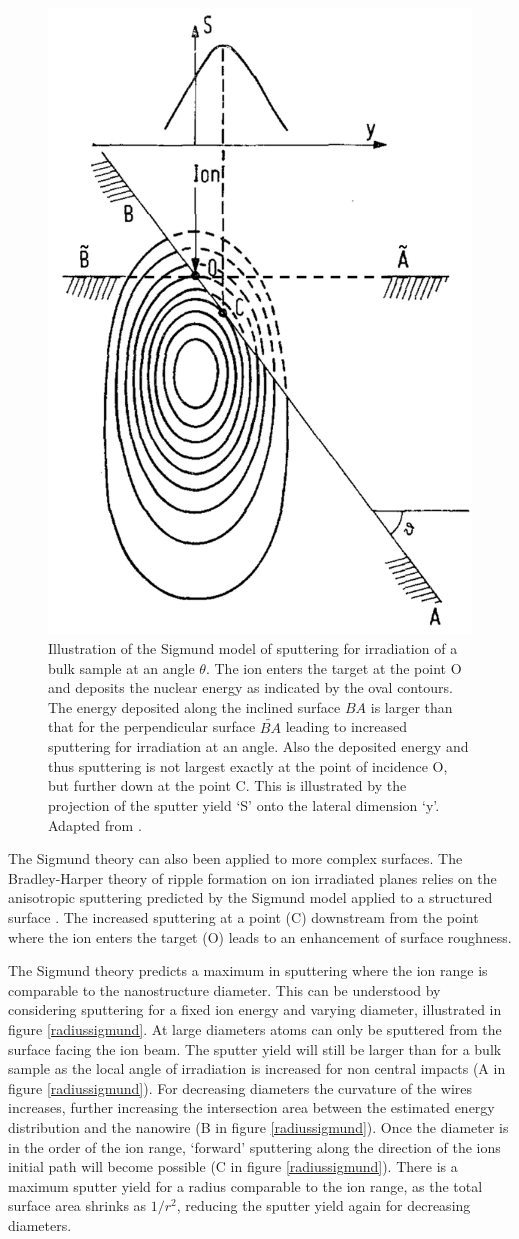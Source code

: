 \begin{figure}
	\centering
		\includegraphics[width=.35\textwidth]{images/anglesigmund.jpg}
	\caption{Illustration of the Sigmund model of sputtering for irradiation of a bulk sample at an angle $\theta$. The ion enters the target at the point O and deposits the nuclear energy as indicated by the oval contours. The energy deposited along the inclined surface $BA$ is larger than that for the perpendicular surface $\widetilde{BA}$ leading to increased sputtering for irradiation at an angle. Also the deposited energy and thus sputtering is not largest exactly at the point of incidence O, but further down at the point C. This is illustrated by the projection of the sputter yield `S' onto the lateral dimension `y'. Adapted from \cite{sigmund_mechanism_1973}.}
	\label{anglesigmund}
\end{figure} 

The Sigmund theory can also been applied to more complex surfaces. The Bradley-Harper theory of ripple formation on ion irradiated planes relies on the anisotropic sputtering predicted by the Sigmund model applied to a structured surface \cite{sigmund_mechanism_1973,bradley_theory_1988}. The increased sputtering at a point (C) downstream from the point where the ion enters the target (O) leads to an enhancement of surface roughness.

The Sigmund theory predicts a maximum in sputtering where the ion range is comparable to the nanostructure diameter. This can be understood by considering sputtering for a fixed ion energy and varying diameter, illustrated in figure \ref{radiussigmund}. At large diameters atoms can only be sputtered from the surface facing the ion beam. The sputter yield will still be larger than for a bulk sample as the local angle of irradiation is increased for non central impacts (A in figure \ref{radiussigmund}). For decreasing diameters the curvature of the wires increases, further increasing the intersection area between the estimated energy distribution and the nanowire (B in figure \ref{radiussigmund}). Once the diameter is in the order of the ion range, `forward' sputtering along the direction of the ions initial path will become possible (C in figure \ref{radiussigmund}). There is a maximum sputter yield for a radius comparable to the ion range, as the total surface area shrinks as $1/r^2$, reducing the sputter yield again for decreasing diameters. 

